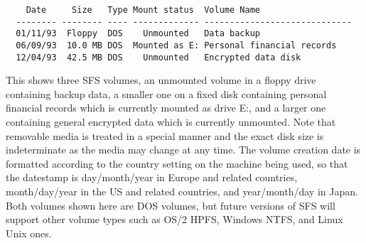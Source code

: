 \begin{verbatim}
    Date     Size   Type Mount status  Volume Name
  -------- -------- ---- ------------- -----------------------------
  01/11/93  Floppy  DOS    Unmounted   Data backup
  06/09/93  10.0 MB DOS  Mounted as E: Personal financial records
  12/04/93  42.5 MB DOS    Unmounted   Encrypted data disk
\end{verbatim}

This shows three SFS volumes, an unmounted volume in a floppy drive containing
backup data, a smaller one on a fixed disk containing personal financial
records which is currently mounted as drive E:, and a larger one containing
general encrypted data which is currently unmounted.  Note that removable media
is treated in a special manner and the exact disk size is indeterminate as the
media may change at any time.  The volume creation date is formatted according
to the country setting on the machine being used, so that the datestamp is
day/month/year in Europe and related countries, month/day/year in the US and
related countries, and year/month/day in Japan.  Both volumes shown here are
DOS volumes, but future versions of SFS will support other volume types such as
OS/2 HPFS, Windows NTFS, and Linux Unix ones.

